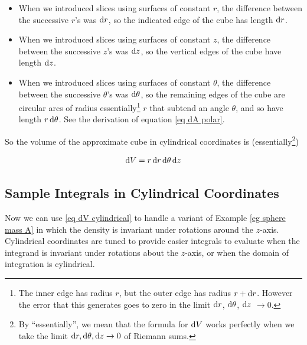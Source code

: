 \begin{itemize}
\item 
When we introduced slices using surfaces of constant $r$, 
the difference between the successive $r$'s was $\mathrm{d}r$, so the indicated
edge of the cube has length $\mathrm{d}r$.
\item 
When we introduced slices using surfaces of constant $z$, 
the difference between the successive $z$'s was $\mathrm{d}z$, so the vertical 
edges of the cube have length $\mathrm{d}z$.
\item 
When we introduced slices using surfaces of constant $\theta$, 
the difference between the successive $\theta$'s was $\mathrm{d}\theta$, so
the remaining edges of the cube are circular arcs of radius 
essentially\footnote{The inner edge has radius $r$,
but the outer edge has radius $r+\mathrm{d}r$. However the
error that this generates goes to zero in the limit $\mathrm{d}r$, $\mathrm{d}\theta$,
$\mathrm{d}z$ $\rightarrow 0$.} $r$ that subtend an angle $\theta$, and 
so have length $r\,\mathrm{d}\theta$. See the derivation of equation 
\eqref{eq dA polar}.
\end{itemize}
So the volume of the approximate cube in cylindrical coordinates is
(essentially\footnote{By ``essentially'', we mean that the formula for
$\mathrm{d}V$ works perfectly when we take the limit $\mathrm{d}r,\mathrm{d}\theta,
\mathrm{d}z\rightarrow 0$ of Riemann sums.})
\begin{impeqn}\label{eq dV cylindrical}
\begin{equation*}
\mathrm{d}V = r\,\mathrm{d}r\,\mathrm{d}\theta\,\mathrm{d}z
\end{equation*}
\end{impeqn}

\subsection{Sample Integrals in Cylindrical Coordinates} \label{sec cylindrical eg}

Now we can use \eqref{eq dV cylindrical} to handle a variant of 
Example \ref{eg sphere mass A}
in which the density is invariant under rotations around the $z$-axis.
Cylindrical coordinates are tuned to provide easier integrals to 
evaluate when the integrand is invariant under rotations about the $z$-axis,
or when the domain of integration is cylindrical.


